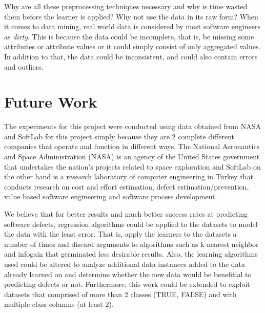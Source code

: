 \documentclass{sig-alternate}
\begin{document}
Why are all these preprocessing techniques necessary and why is time wasted them before the learner is applied? Why not use the data in its raw form? When it comes to data mining, real world data is considered by most software engineers as {\em dirty}. This is because the data could be incomplete, that is, be missing some attributes or attribute values or it could simply consist of only aggregated values. In addition to that, the data could be inconsistent, and could also contain errors and outliers.


\section{Future Work}
The experiments for this project were conducted using data obtained from NASA and SoftLab for this project simply because they are 2 complete different companies that operate and function in different ways. 
The National Aeronautics and Space Administration (NASA) is an agency of the United States government that undertakes the nation's projects related to space exploration and SoftLab on the other hand is a research laboratory of computer engineering in Turkey that conducts research on cost and effort estimation, defect estimation/prevention, value based software engineering and software process development. 

We believe that for better results and much better success rates at predicting software defects, regression algorithms could be applied to the datasets to model the data with the least error. That is, apply the learners to the datasets a number of times and discard arguments to algorithms such as k-nearest neighbor and infogain that germinated less desirable results. Also, the learning algorithms used could be altered to analyze additional data instances added to the data already learned on and determine whether the new data would be benefitial to predicting defects or not.
Furthermore, this work could be extended to exploit datasets that comprised of more than 2 classes (TRUE, FALSE) and with multiple class columns (at least 2).
\end{document}
